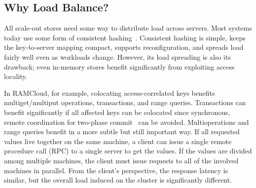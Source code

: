 %


\subsection{Why Load Balance?}
\label{sec:why-balance}

All scale-out stores need some way to distribute load across servers.
Most systems today use
some form of consistent
hashing~\cite{chord,dynamo,cassandra}. Consistent hashing is simple,
keeps the key-to-server mapping compact, supports reconfiguration, and
spreads load fairly well even as workloads change. However, its
load spreading is also its drawback; even in-memory stores benefit
significantly from exploiting access locality.

In RAMCloud, for example, colocating access-correlated keys benefits
multiget/multiput operations, transactions, and range queries. Transactions can
benefit significantly if all affected keys can be colocated since
synchronous, remote
coordination for two-phase commit~\cite{ramcloud-rifl,sinfonia} can be avoided.
Multioperations and range queries benefit in a more subtle but still important
way. If all requested values live together on the same machine, a client can
issue a single remote procedure call (RPC) to a single server to get
the values. If the values are divided among multiple machines, the client must
issue requests to all of the involved machines in parallel. From the client's
perspective, the response latency is similar, but the overall load
induced on the cluster is significantly different.

